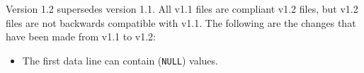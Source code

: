 Version 1.2 supersedes version 1.1. All v1.1 files are compliant v1.2 files, but
v1.2 files are not backwards compatible with v1.1. The following are the changes
that have been made from v1.1 to v1.2:

\begin{itemize}
\item The first data line can contain (\texttt{\small NULL}) values.
\end{itemize}
